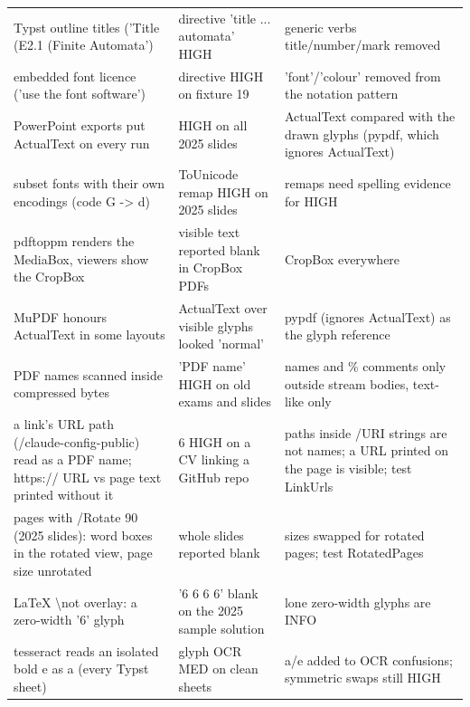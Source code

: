 \documentclass[10pt,a4paper]{article}
\begin{document}
\begin{longtable}{@{}P{6cm}P{4.6cm}P{6.4cm}@{}}
\footnotesize Typst outline titles ('Title (E2.1 (Finite Automata') & \footnotesize directive 'title ... automata' HIGH & \footnotesize generic verbs title/number/mark removed\\
\footnotesize embedded font licence ('use the font software') & \footnotesize directive HIGH on fixture 19 & \footnotesize 'font'/'colour' removed from the notation pattern\\
\footnotesize PowerPoint exports put ActualText on every run & \footnotesize HIGH on all 2025 slides & \footnotesize ActualText compared with the drawn glyphs (pypdf, which ignores ActualText)\\
\footnotesize subset fonts with their own encodings (code G -\textgreater{} d) & \footnotesize ToUnicode remap HIGH on 2025 slides & \footnotesize remaps need spelling evidence for HIGH\\
\footnotesize pdftoppm renders the MediaBox, viewers show the CropBox & \footnotesize visible text reported blank in CropBox PDFs & \footnotesize CropBox everywhere\\
\footnotesize MuPDF honours ActualText in some layouts & \footnotesize ActualText over visible glyphs looked 'normal' & \footnotesize pypdf (ignores ActualText) as the glyph reference\\
\footnotesize PDF names scanned inside compressed bytes & \footnotesize 'PDF name' HIGH on old exams and slides & \footnotesize names and \% comments only outside stream bodies, text-like only\\
\footnotesize a link's URL path (/claude-config-public) read as a PDF name; https:// URL vs page text printed without it & \footnotesize 6 HIGH on a CV linking a GitHub repo & \footnotesize paths inside /URI strings are not names; a URL printed on the page is visible; test LinkUrls\\
\footnotesize pages with /Rotate 90 (2025 slides): word boxes in the rotated view, page size unrotated & \footnotesize whole slides reported blank & \footnotesize sizes swapped for rotated pages; test RotatedPages\\
\footnotesize LaTeX \textbackslash{}not overlay: a zero-width '6' glyph & \footnotesize '6 6 6 6' blank on the 2025 sample solution & \footnotesize lone zero-width glyphs are INFO\\
\footnotesize tesseract reads an isolated bold e as a (every Typst sheet) & \footnotesize glyph OCR MED on clean sheets & \footnotesize a/e added to OCR confusions; symmetric swaps still HIGH\\

\end{longtable}
\end{document}
